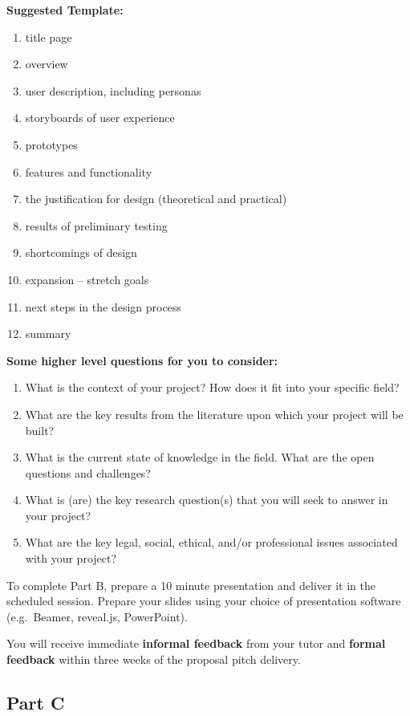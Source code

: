 \textbf{Suggested Template: }
\begin{enumerate}
	\item title page
	\item overview
	\item user description, including personas
	\item storyboards of user experience
	\item prototypes
	\item features and functionality
	\item the justification for design (theoretical and practical) 
	\item results of preliminary testing 
	\item shortcomings of design
	\item expansion – stretch goals
	\item next steps in the design process
	\item summary
\end{enumerate}

\textbf{Some higher level questions for you to consider: }
\begin{enumerate}[label=(\roman*)]
	\item What is the context of your project? How does it fit into your specific field?
	\item What are the key results from the literature upon which your project will be built?
	\item What is the current state of knowledge in the field. What are the open questions and challenges?
	\item What is (are) the key research question(s) that you will seek to answer in your project?
	\item What are the key legal, social, ethical, and/or professional issues associated with your project?
\end{enumerate}

To complete Part B, prepare a 10 minute presentation and deliver it in the scheduled session. Prepare your slides using your choice of presentation software (e.g.\ Beamer, reveal.js, PowerPoint).

You will receive immediate \textbf{informal feedback} from your tutor and \textbf{formal feedback} within three weeks of the proposal pitch delivery.

\subsection*{Part C}

